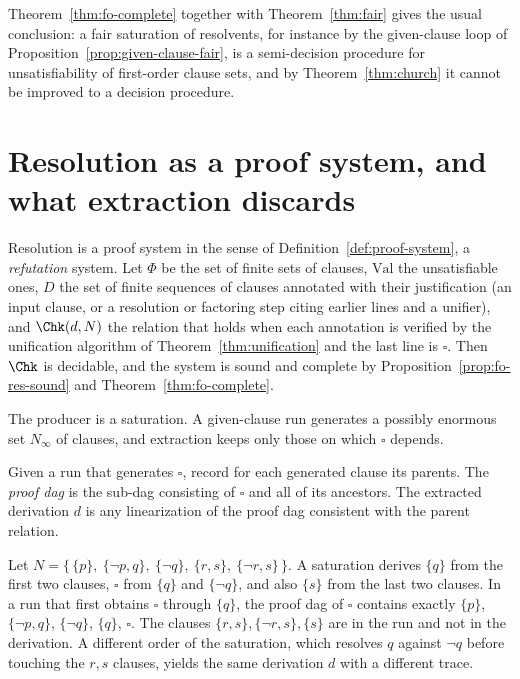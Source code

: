 Theorem~\ref{thm:fo-complete} together with Theorem~\ref{thm:fair} gives the usual conclusion: a fair saturation of resolvents, for instance by the given-clause loop of Proposition~\ref{prop:given-clause-fair}, is a semi-decision procedure for unsatisfiability of first-order clause sets, and by Theorem~\ref{thm:church} it cannot be improved to a decision procedure.

\section{Resolution as a proof system, and what extraction discards}
\label{sec:res-ps}

Resolution is a proof system in the sense of Definition~\ref{def:proof-system}, a \emph{refutation} system. Let $\Phi$ be the set of finite sets of clauses, $\mathrm{Val}$ the unsatisfiable ones, $D$ the set of finite sequences of clauses annotated with their justification (an input clause, or a resolution or factoring step citing earlier lines and a unifier), and $\Chk(d,N)$ the relation that holds when each annotation is verified by the unification algorithm of Theorem~\ref{thm:unification} and the last line is $\square$. Then $\Chk$ is decidable, and the system is sound and complete by Proposition~\ref{prop:fo-res-sound} and Theorem~\ref{thm:fo-complete}.

The producer is a saturation. A given-clause run generates a possibly enormous set $N_\infty$ of clauses, and extraction keeps only those on which $\square$ depends.

\begin{definition}
\label{def:proof-dag}
Given a run that generates $\square$, record for each generated clause its parents. The \emph{proof dag} is the sub-dag consisting of $\square$ and all of its ancestors. The extracted derivation $d$ is any linearization of the proof dag consistent with the parent relation.
\end{definition}

\begin{example}
\label{ex:unused}
Let $N=\{\,\{p\},\ \{\neg p,q\},\ \{\neg q\},\ \{r,s\},\ \{\neg r,s\}\,\}$. A saturation derives $\{q\}$ from the first two clauses, $\square$ from $\{q\}$ and $\{\neg q\}$, and also $\{s\}$ from the last two clauses. In a run that first obtains $\square$ through $\{q\}$, the proof dag of $\square$ contains exactly $\{p\}$, $\{\neg p,q\}$, $\{\neg q\}$, $\{q\}$, $\square$. The clauses $\{r,s\},\{\neg r,s\},\{s\}$ are in the run and not in the derivation. A different order of the saturation, which resolves $q$ against $\neg q$ before touching the $r,s$ clauses, yields the same derivation $d$ with a different trace.
\end{example}

